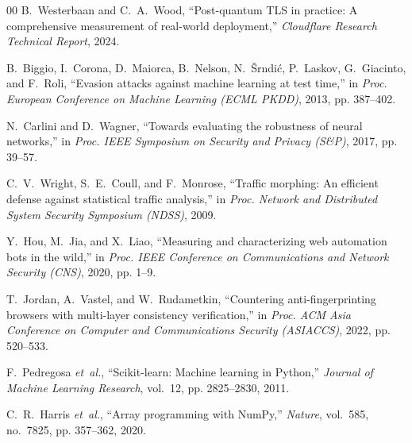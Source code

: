 \documentclass[conference]{IEEEtran}
\begin{document}
\begin{thebibliography}{00}
B.~Westerbaan and C.~A.~Wood, ``Post-quantum TLS in practice: A comprehensive measurement of real-world deployment,'' \emph{Cloudflare Research Technical Report}, 2024.

B.~Biggio, I.~Corona, D.~Maiorca, B.~Nelson, N.~{\v{S}}rndi{\'c}, P.~Laskov, G.~Giacinto, and F.~Roli, ``Evasion attacks against machine learning at test time,'' in \emph{Proc. European Conference on Machine Learning (ECML PKDD)}, 2013, pp. 387--402.

N.~Carlini and D.~Wagner, ``Towards evaluating the robustness of neural networks,'' in \emph{Proc. IEEE Symposium on Security and Privacy (S\&P)}, 2017, pp. 39--57.

C.~V.~Wright, S.~E.~Coull, and F.~Monrose, ``Traffic morphing: An efficient defense against statistical traffic analysis,'' in \emph{Proc. Network and Distributed System Security Symposium (NDSS)}, 2009.

Y.~Hou, M.~Jia, and X.~Liao, ``Measuring and characterizing web automation bots in the wild,'' in \emph{Proc. IEEE Conference on Communications and Network Security (CNS)}, 2020, pp. 1--9.

T.~Jordan, A.~Vastel, and W.~Rudametkin, ``Countering anti-fingerprinting browsers with multi-layer consistency verification,'' in \emph{Proc. ACM Asia Conference on Computer and Communications Security (ASIACCS)}, 2022, pp. 520--533.

F.~Pedregosa \emph{et~al.}, ``Scikit-learn: Machine learning in Python,'' \emph{Journal of Machine Learning Research}, vol.~12, pp. 2825--2830, 2011.

C.~R.~Harris \emph{et~al.}, ``Array programming with NumPy,'' \emph{Nature}, vol.~585, no.~7825, pp. 357--362, 2020.

\end{thebibliography}
\end{document}
